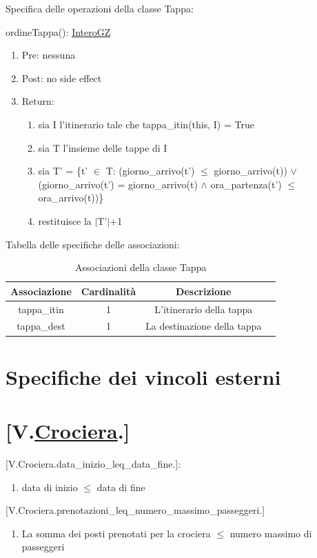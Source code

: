 \documentclass{article}
\begin{document}
Specifica delle operazioni della classe Tappa:

ordineTappa(): \hyperref[sec:InteroGZ]{InteroGZ}
\begin{enumerate}
    \item Pre: nessuna
    \item Post: no side effect
    \item Return:
    \begin{enumerate}
        \item sia I l'itinerario tale che tappa\_itin(this, I) = True
        \item sia T l'insieme delle tappe di I
        \item sia T' = \{t' $\in$ T: (giorno\_arrivo(t') $\leq$ giorno\_arrivo(t)) \newline $\lor$ (giorno\_arrivo(t') = giorno\_arrivo(t) $\land$ ora\_partenza(t') $\leq$ ora\_arrivo(t))\}
        \item restituisce la $|$T'$|$+1
    \end{enumerate}
\end{enumerate}


Tabella delle specifiche delle associazioni:
\begin{table}[h!]
    \centering
    \begin{tabular}{|c|c|c|c|}
        \hline
        Associazione & Cardinalità & Descrizione \\
        \hline
        tappa\_itin & 1 & L'itinerario della tappa \\
        tappa\_dest & 1 & La destinazione della tappa \\
        \hline
    \end{tabular}
    \caption{Associazioni della classe Tappa}
\end{table}

\newpage
\section{Specifiche dei vincoli esterni}

\section*{[V.\hyperref[sec:Crociera]{Crociera}.]}
    [V.Crociera.data\_inizio\_leq\_data\_fine.]:
    \begin{enumerate}
        \item data di inizio $\leq$ data di fine
    \end{enumerate}
    [V.Crociera.prenotazioni\_leq\_numero\_massimo\_passeggeri.]
    \begin{enumerate}
        \item La somma dei posti prenotati per la crociera $\leq$ numero massimo di passeggeri
    \end{enumerate}
\end{document}
